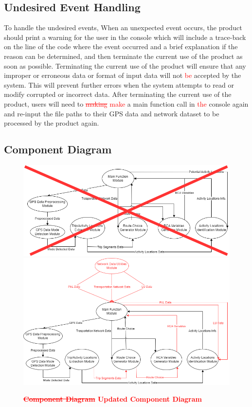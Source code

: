 \documentclass[12pt, titlepage]{article}
\begin{document}
\subsection{Undesired Event Handling}
To handle the undesired events, When an unexpected event occurs, the product should print a warning for the user in the console which will include a trace-back on the line of the code where the event occurred and a brief explanation if the reason can be determined, and then terminate the current use of the product as soon as possible. Terminating the current use of the product will ensure that any improper or erroneous data or format of input data will not \textcolor{red}{be} accepted by the system. This will prevent further errors when the system attempts to read or modify corrupted or incorrect data. After terminating the current use of the product, users will need to \textcolor{red}{\sout{making} make} a main function call in \textcolor{red}{the} console again and re-input the file paths to their GPS data and network dataset to be processed by the product again.

\newpage
\subsection{Component Diagram}
\begin{figure}[!htbp]
    \centering
    \includegraphics[scale=0.60]{Component_Diagram_old.png}
    \includegraphics[scale=0.60]{Component_Diagram_new.png}
    \caption{\bf \textcolor{red}{\sout{Component Diagram} Updated Component Diagram}}
\end{figure}
\newpage
\end{document}
